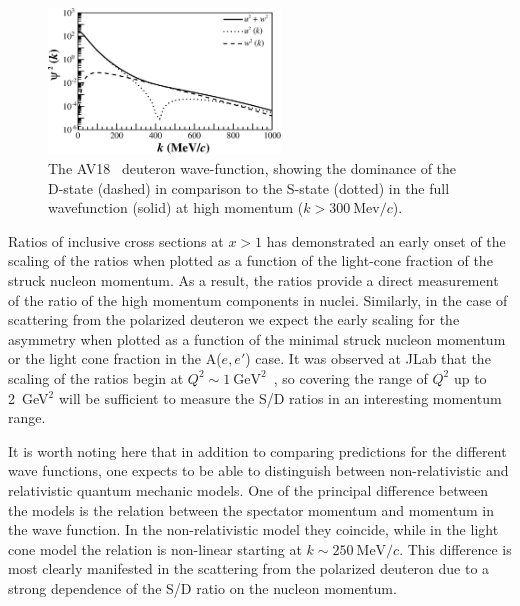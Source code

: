 \begin{figure}
\begin{center}
\includegraphics[width=0.55\textwidth]{figs/sd_wf_av18.eps}
\caption{\label{sd-wf} The AV18~\cite{PhysRevC.84.034003} deuteron wave-function, showing the dominance of the D-state (dashed) in comparison to the S-state (dotted) in the full wavefunction (solid) at high momentum ($k>300\mathrm{~Mev}/c$).}
\end{center}
\end{figure}

Ratios of inclusive cross sections at $x>1$ has demonstrated an early onset of the scaling of the ratios when plotted as a function of the light-cone fraction of the struck nucleon momentum.  As a result, the ratios provide a direct measurement of the ratio of the high momentum components in nuclei.  Similarly, in the case of scattering from the polarized deuteron we expect the early scaling for the asymmetry when plotted as a function of the minimal struck nucleon momentum or the light cone fraction in the A($e,e'$) case.
It was observed at JLab that the scaling of the ratios begin at $Q^2 \sim 1 \mathrm{~GeV}^2$~\cite{Arrington:1998ps}, so covering the range of $Q^2$ up to 2~GeV$^2$ will be sufficient to  measure the S/D ratios in an interesting momentum range. 







It is worth noting here that in addition to comparing predictions for the different wave functions, one expects to be able to distinguish between non-relativistic and relativistic quantum mechanic models.  One of the principal difference between the models is the relation between the spectator momentum and momentum in the wave function. In the non-relativistic model they coincide, while in the light cone model the relation is non-linear starting at $k \sim 250 \mathrm{~MeV}/c$. This difference is most clearly manifested in the scattering from the polarized deuteron due to a strong dependence of the S/D ratio on the nucleon momentum.

